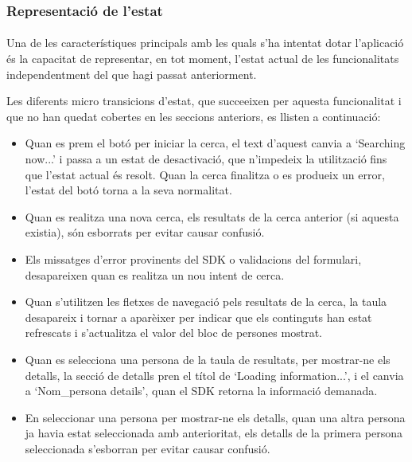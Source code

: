 \subsubsection{Representació de l'estat}

\paragraph{}
Una de les característiques principals amb les quals s'ha intentat dotar l'aplicació és la capacitat de representar, en tot moment, l'estat actual de les funcionalitats independentment del que hagi passat anteriorment.

Les diferents micro transicions d'estat, que succeeixen per aquesta funcionalitat i que no han quedat cobertes en les seccions anteriors, es llisten a continuació:

\begin{itemize}
    \item Quan es prem el botó per iniciar la cerca, el text d'aquest canvia a `Searching now...' i passa a un estat de desactivació, que n'impedeix la utilització fins que l'estat actual és resolt. Quan la cerca finalitza o es produeix un error, l'estat del botó torna a la seva normalitat.
    \item Quan es realitza una nova cerca, els resultats de la cerca anterior (si aquesta existia), són esborrats per evitar causar confusió.
    \item Els missatges d'error provinents del SDK o validacions del formulari, desapareixen quan es realitza un nou intent de cerca.
    \item Quan s'utilitzen les fletxes de navegació pels resultats de la cerca, la taula desapareix i tornar a aparèixer per indicar que els continguts han estat refrescats i s'actualitza el valor del bloc de persones mostrat.
    \item Quan es selecciona una persona de la taula de resultats, per mostrar-ne els detalls, la secció de detalls pren el títol de `Loading information...', i el canvia a `Nom\_persona details', quan el SDK retorna la informació demanada.
    \item En seleccionar una persona per mostrar-ne els detalls, quan una altra persona ja havia estat seleccionada amb anterioritat, els detalls de la primera persona seleccionada s’esborran per evitar causar confusió.
\end{itemize}
